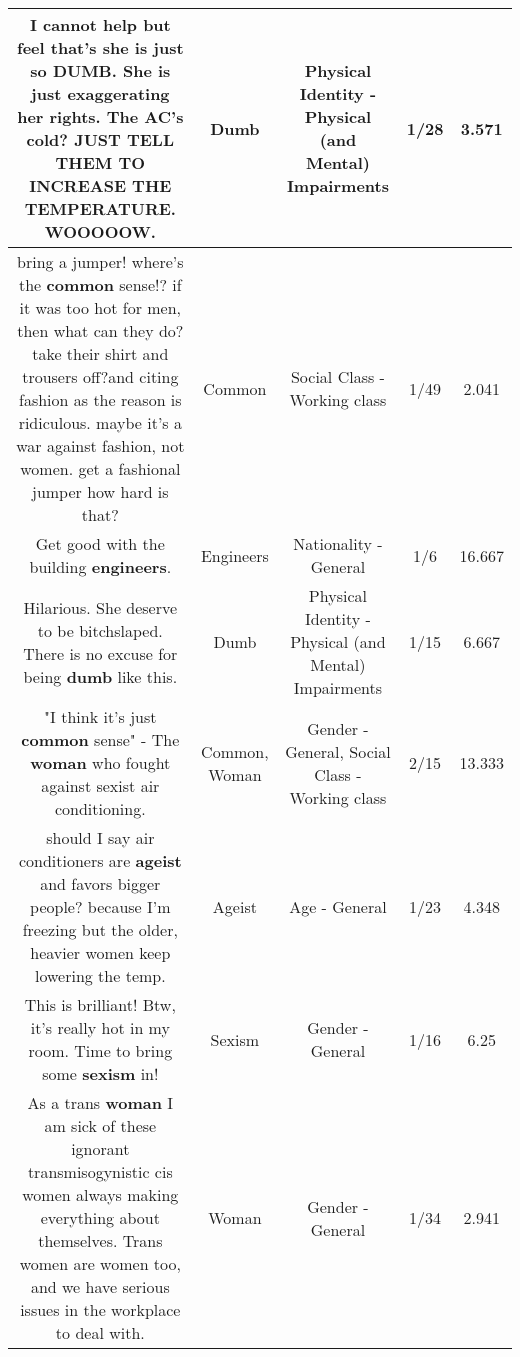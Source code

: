 \documentclass[11pt]{article}
\newlength\mylength
\begin{document}
\begin{center}
\begin{longtable}{|C{.65\mylength}|C{.30\mylength}|C{.12\mylength}|C{.12\mylength}|C{.12\mylength}|}
  \small I cannot help but feel that's she is just so \textbf{DUMB}. She is just exaggerating her rights. The AC's cold? JUST TELL THEM TO INCREASE THE TEMPERATURE. WOOOOOW.\normalsize   & Dumb & Physical Identity - Physical (and Mental) Impairments & 1/28 & 3.571 \\  \hline
  \small bring a jumper! where's the \textbf{common} sense!? if it was too hot for men, then what can they do? take their shirt and trousers off?and citing fashion as the reason is ridiculous. maybe it's a war against fashion, not women. get a fashional jumper how hard is that?\normalsize   & Common & Social Class - Working class & 1/49 & 2.041 \\  \hline
  \small Get good with the building \textbf{engineers}.\normalsize   & Engineers & Nationality - General & 1/6 & 16.667 \\  \hline
  \small Hilarious. She deserve to be bitchslaped. There is no excuse for being \textbf{dumb} like this.\normalsize   & Dumb & Physical Identity - Physical (and Mental) Impairments & 1/15 & 6.667 \\  \hline
  \small "I think it's just \textbf{common} sense" - The \textbf{woman} who fought against sexist air conditioning.\normalsize   & Common, Woman & Gender - General, Social Class - Working class & 2/15 & 13.333 \\  \hline
  \small should I say air conditioners are \textbf{ageist} and favors bigger people? because I'm freezing but the older, heavier women keep lowering the temp.\normalsize   & Ageist & Age - General & 1/23 & 4.348 \\  \hline
  \small This is brilliant! Btw, it's really hot in my room. Time to bring some \textbf{sexism} in!\normalsize   & Sexism & Gender - General & 1/16 & 6.25 \\  \hline
  \small As a trans \textbf{woman} I am sick of these ignorant transmisogynistic cis women always making everything about themselves. Trans women are women too, and we have serious issues in the workplace to deal with.\normalsize   & Woman & Gender - General & 1/34 & 2.941 \\  \hline

\end{longtable}
\end{center}
\end{document}
